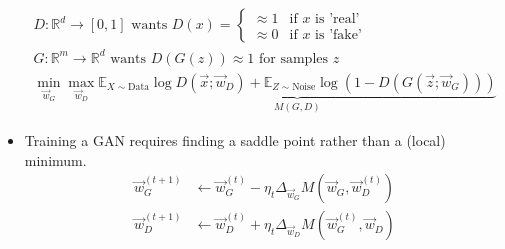 \documentclass[8pt,a4paper]{scrartcl}
\begin{document}
\begin{multicols*}{3}
\begin{itemize}[leftmargin=*]
\begin{align*}
D:\mathbb{R}^d\rightarrow [0,1]\text{ wants }D(x)=\begin{cases}\approx 1&\text{if $x$ is 'real'}\\ \approx 0&\text{if $x$ is 'fake'}\end{cases}\\
G:\mathbb{R}^m\rightarrow\mathbb{R}^d\text{ wants }D(G(z))\approx 1 \text{ for samples }z\\
\min\limits_{\vec{w}_G}\max\limits_{\vec{w}_D}\underbrace{\mathbb{E}_{X\sim\text{Data}}\log D(\vec{x};\vec{w}_D)+\mathbb{E}_{Z\sim\text{Noise}}\log(1-D(G(\vec{z};\vec{w}_G)))}_{M(G,D)}
\end{align*}
\item Training a GAN requires finding a saddle point rather than a (local) minimum.
\begin{align*}
\vec{w}_G^{(t+1)}&\leftarrow\vec{w}_G^{(t)}-\eta_t\Delta_{\vec{w}_G}M(\vec{w}_G,\vec{w}_D^{(t)})\\
\vec{w}_D^{(t+1)}&\leftarrow\vec{w}_D^{(t)}+\eta_t\Delta_{\vec{w}_D}M(\vec{w}_G^{(t)},\vec{w}_D)
\end{align*}
\end{itemize}

\end{multicols*}
\end{document}
